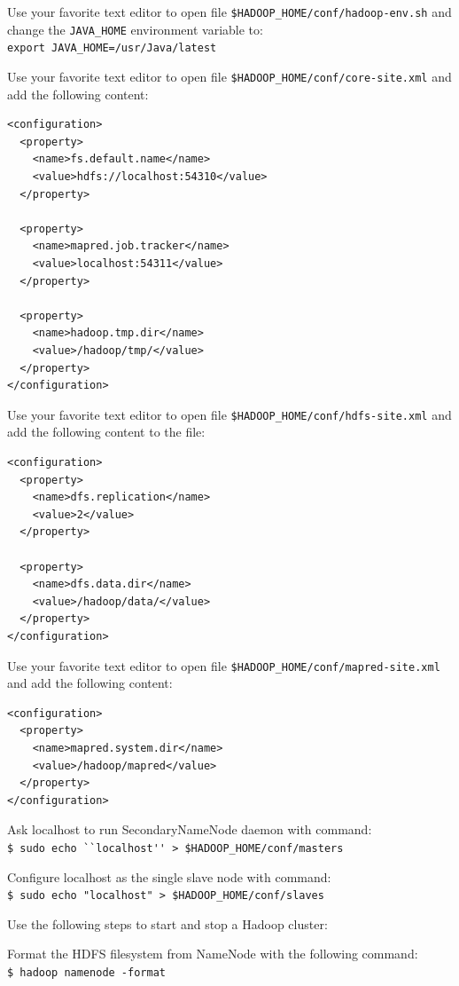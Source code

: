 Use your favorite text editor to open file \verb|$HADOOP_HOME/conf/hadoop-env.sh| and change the \verb|JAVA_HOME| environment variable to: \\
\verb|export JAVA_HOME=/usr/Java/latest|

Use your favorite text editor to open file \verb|$HADOOP_HOME/conf/core-site.xml| and add the following content:
\lstset{style=bashstyle}
\begin{lstlisting}[caption=Content of the core-site.xml file]
<configuration>
  <property>
    <name>fs.default.name</name>
    <value>hdfs://localhost:54310</value>
  </property>

  <property>
    <name>mapred.job.tracker</name>
    <value>localhost:54311</value>
  </property>

  <property>
    <name>hadoop.tmp.dir</name>
    <value>/hadoop/tmp/</value>
  </property>
</configuration>
\end{lstlisting}

Use your favorite text editor to open file \verb|$HADOOP_HOME/conf/hdfs-site.xml| and add the following content to the file:
\begin{lstlisting}[caption=Content of file hdfs-site.xml]
<configuration>
  <property>
    <name>dfs.replication</name>
    <value>2</value>
  </property>

  <property>
    <name>dfs.data.dir</name>
    <value>/hadoop/data/</value>
  </property>
</configuration>
\end{lstlisting}

Use your favorite text editor to open file \verb|$HADOOP_HOME/conf/mapred-site.xml| and add the following content:
\begin{lstlisting}[caption=Content of file mapred-site.xml]
<configuration>
  <property>
    <name>mapred.system.dir</name>
    <value>/hadoop/mapred</value>
  </property>
</configuration>
\end{lstlisting}

Ask localhost to run SecondaryNameNode daemon with command: \\
\verb|$ sudo echo ``localhost'' > $HADOOP_HOME/conf/masters|

Configure localhost as the single slave node with command: \\
\verb|$ sudo echo "localhost" > $HADOOP_HOME/conf/slaves|

Use the following steps to start and stop a Hadoop cluster:

Format the HDFS filesystem from NameNode with the following command: \\
\verb|$ hadoop namenode -format|

